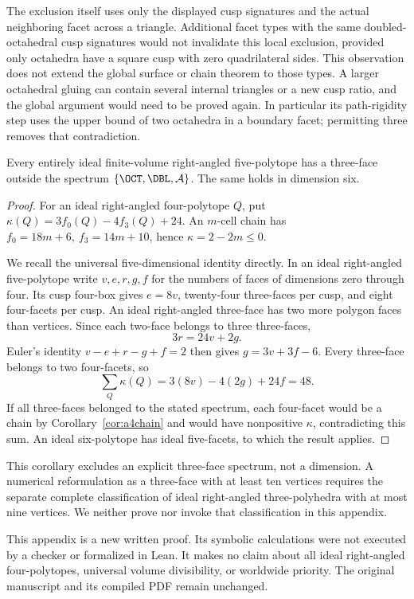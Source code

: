 The exclusion itself uses only the displayed cusp signatures and the
actual neighboring facet across a triangle. Additional facet types
with the same doubled-octahedral cusp signatures would not invalidate
this local exclusion, provided only octahedra have a square cusp with
zero quadrilateral sides. This observation does not extend the global
surface or chain theorem to those types. A larger octahedral gluing
can contain several internal triangles or a new cusp ratio, and the
global argument would need to be proved again. In particular its
path-rigidity step uses the upper bound of two octahedra in a boundary
facet; permitting three removes that contradiction.

\begin{corollary}\label{cor:a4ideal5}
Every entirely ideal finite-volume right-angled five-polytope has
a three-face outside the spectrum \(\{\OCT,\DBL,\mathcal A\}\).
The same holds in dimension six.
\end{corollary}
\begin{proof}
For an ideal right-angled four-polytope \(Q\), put
\(\kappa(Q)=3f_0(Q)-4f_3(Q)+24\).
An \(m\)-cell chain has \(f_0=18m+6,\ f_3=14m+10\), hence
\(\kappa=2-2m\le0\).

We recall the universal five-dimensional identity directly.
In an ideal right-angled five-polytope write \(v,e,r,g,f\)
for the numbers of faces of dimensions zero through four.
Its cusp four-box gives \(e=8v\), twenty-four three-faces per
cusp, and eight four-facets per cusp. An ideal right-angled
three-face has two more polygon faces than vertices.
Since each two-face belongs to three three-faces,
\[
 3r=24v+2g.
\]
Euler's identity \(v-e+r-g+f=2\) then gives
\(g=3v+3f-6\). Every three-face belongs to two four-facets,
so
\[
 \sum_Q\kappa(Q)=3(8v)-4(2g)+24f=48.
\]
If all three-faces belonged to the stated spectrum, each four-facet
would be a chain by Corollary~\ref{cor:a4chain} and would have
nonpositive \(\kappa\), contradicting this sum. An ideal
six-polytope has ideal five-facets, to which the result applies.
\end{proof}

This corollary excludes an explicit three-face spectrum, not a
dimension. A numerical reformulation as a three-face with at least
ten vertices requires the separate complete classification of ideal
right-angled three-polyhedra with at most nine vertices. We neither
prove nor invoke that classification in this appendix.

This appendix is a new written proof. Its symbolic calculations were
not executed by a checker or formalized in Lean. It makes no claim
about all ideal right-angled four-polytopes, universal volume
divisibility, or worldwide priority. The original manuscript and
its compiled PDF remain unchanged.
